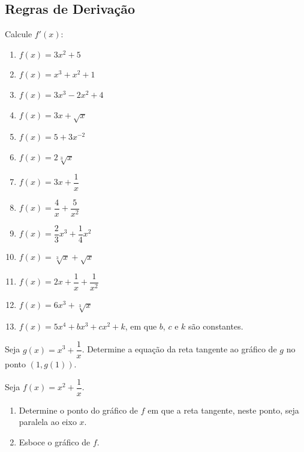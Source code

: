 \clearpage

\subsection{Regras de Derivação}

\begin{exercicio}[1]
\label{ex:7.7.1}
Calcule $f'(x)$:
\begin{enumerate}[label=\alph*)]
    \item $f(x) = 3x^2 + 5$
    \item $f(x) = x^3 + x^2 + 1$
    \item $f(x) = 3x^3 - 2x^2 + 4$
    \item $f(x) = 3x + \sqrt{x}$
    \item $f(x) = 5 + 3x^{-2}$
    \item $f(x) = 2\sqrt[3]{x}$
    \item $f(x) = 3x + \dfrac{1}{x}$
    \item $f(x) = \dfrac{4}{x} + \dfrac{5}{x^2}$
    \item $f(x) = \dfrac{2}{3}x^3 + \dfrac{1}{4}x^2$
    \item $f(x) = \sqrt[3]{x} + \sqrt{x}$
    \item $f(x) = 2x + \dfrac{1}{x} + \dfrac{1}{x^2}$
    \item $f(x) = 6x^3 + \sqrt[3]{x}$
    \item $f(x) = 5x^4 + bx^3 + cx^2 + k$, em que $b$, $c$ e $k$ são constantes.
\end{enumerate}
\end{exercicio}

\begin{exercicio}[2]
\label{ex:7.7.2}
Seja $g(x) = x^3 + \dfrac{1}{x}$. Determine a equação da reta tangente ao gráfico de $g$ no ponto $(1, g(1))$.
\end{exercicio}

\begin{exercicio}[3]
\label{ex:7.7.3}
Seja $f(x) = x^2 + \dfrac{1}{x}$.
\begin{enumerate}[label=\alph*)]
    \item Determine o ponto do gráfico de $f$ em que a reta tangente, neste ponto, seja paralela ao eixo $x$.
    \item Esboce o gráfico de $f$.
\end{enumerate}
\end{exercicio}

